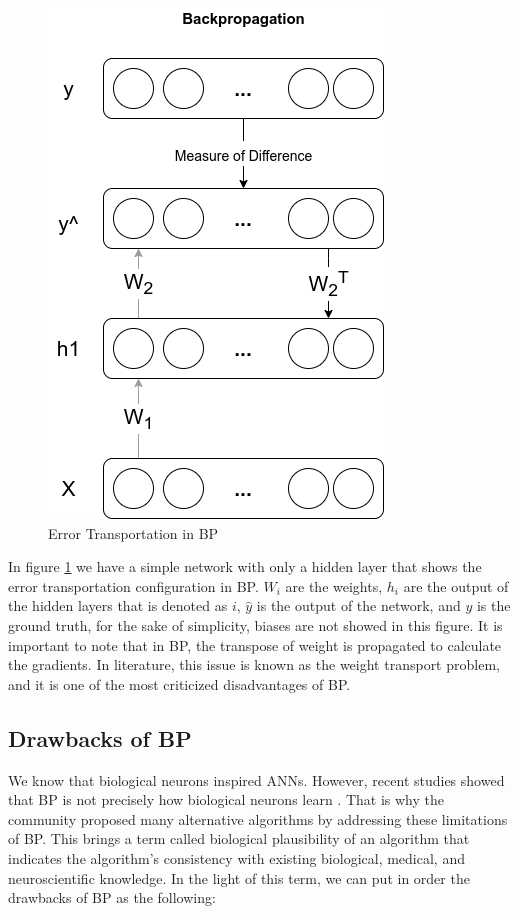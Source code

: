 \documentclass[a4paper, nobind]{templates/ociamthesis}
\begin{document}
\begin{figure}

{\centering \includegraphics[width=0.3\linewidth]{figures/1_BP_Error} 

}

\caption{Error Transportation in BP}\label{fig:BP-Error}
\end{figure}

\noindent In figure \ref{fig:BP-Error} we have a simple network with only a hidden layer that shows the error transportation configuration in BP. \(W_i\) are the weights, \(h_i\) are the output of the hidden layers that is denoted as \(i\), \(\hat{y}\) is the output of the network, and \(y\) is the ground truth, for the sake of simplicity, biases are not showed in this figure. It is important to note that in BP, the transpose of weight is propagated to calculate the gradients. In literature, this issue is known as the weight transport problem, and it is one of the most criticized disadvantages of BP.

\hypertarget{drawbacks-of-bp}{%
\subsection{Drawbacks of BP}\label{drawbacks-of-bp}}

We know that biological neurons inspired ANNs. However, recent studies showed that BP is not precisely how biological neurons learn \cite{bengio2016biologically}. That is why the community proposed many alternative algorithms by addressing these limitations of BP. This brings a term called biological plausibility of an algorithm that indicates the algorithm's consistency with existing biological, medical, and neuroscientific knowledge. In the light of this term, we can put in order the drawbacks of BP as the following:
\end{document}

